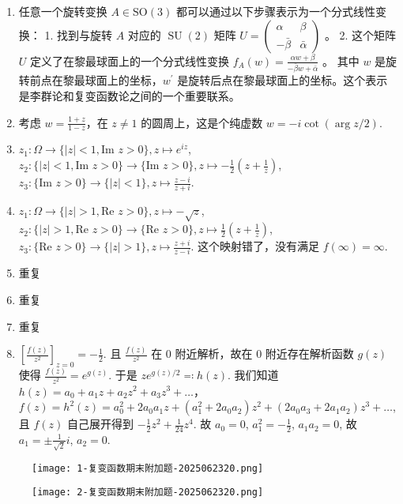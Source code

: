 \begin{enumerate}
	\item 任意一个旋转变换 $A \in \mathrm{SO}(3)$ 都可以通过以下步骤表示为一个分式线性变换：
1. 找到与旋转 $A$ 对应的 $\operatorname{SU}(2)$ 矩阵 $U=\left(\begin{array}{cc}\alpha & \beta \\ -\bar{\beta} & \bar{\alpha}\end{array}\right)$ 。
2. 这个矩阵 $U$ 定义了在黎最球面上的一个分式线性变换 $f_A(w)=\frac{\alpha w+\beta}{-\bar{\beta} w+\bar{\alpha}}$ 。
其中 $w$ 是旋转前点在黎最球面上的坐标，$w^{\prime}$ 是旋转后点在黎最球面上的坐标。这个表示是李群论和复变函数论之间的一个重要联系。
	\item 考虑 $w=\frac{1+z}{1-z}$，在 $z\neq1$ 的圆周上，这是个纯虚数 $w=-i\cot(\arg z/2 )$.
	\item $z_1:\Omega\to \{ \lvert z \rvert<1,\text{Im }z>0 \},z\mapsto e^{ iz }$, $z_2:\{ \lvert z \rvert<1,\text{Im }z>0 \}\to \{ \text{Im }z>0 \},z\mapsto-\frac{1}{2}\left( z+\frac{1}{z} \right)$, $z_3:\{ \text{Im }z>0 \}\to \{ \lvert z \rvert<1 \},z\mapsto\frac{z-i}{z+i}$.
	\item $z_1:\Omega\to \{ \lvert z \rvert>1 ,\text{Re }z>0\},z\mapsto -\sqrt{ z }$, $z_2:\{ \lvert z \rvert>1,\text{Re }z >0\}\to \{ \text{Re }z>0 \},z\mapsto\frac{1}{2}\left( z+\frac{1}{z} \right)$, $z_3:\{ \text{Re }z>0 \}\to \{ \lvert z \rvert>1 \},z\mapsto\frac{z+i}{z-i}$. 这个映射错了，没有满足 $f(\infty)=\infty$.
	\item 重复
	\item 重复
	\item 重复
	\item $\left[ \frac{f(z)}{z^{2}} \right]_{z=0}=-\frac{1}{2}$. 且 $\frac{f(z)}{z^{2}}$ 在 0 附近解析，故在 0 附近存在解析函数 $g(z)$ 使得 $\frac{f(z)}{z^{2}}=e^{ g(z) }$. 于是 $ze^{ g(z)/2 }\eqqcolon h(z)$. 我们知道 $h(z)=a_0+a_1z+a_2z^{2}+a_3z^{3}+\dots$，$f(z)=h^{2}(z)=a_0^{2}+2a_0a_1z+(a_1^{2}+2a_0a_2)z^{2}+(2a_0a_3+2a_1a_2)z^{3}+\dots$, 且 $f(z)$ 自己展开得到 $-\frac{1}{2}z^{2}+\frac{1}{24}z^{4}$. 故 $a_0=0$, $a_1^{2}=-\frac{1}{2}$, $a_1a_2=0$, 故 $a_1=\pm\frac{1}{\sqrt{ 2 }}i$, $a_2=0$.
\end{enumerate}

\begin{figure}[H]
\centering
\texttt{[image: 1-复变函数期末附加题-2025062320.png]}
\label{}
\end{figure}

\begin{figure}[H]
\centering
\texttt{[image: 2-复变函数期末附加题-2025062320.png]}
\label{}
\end{figure}

